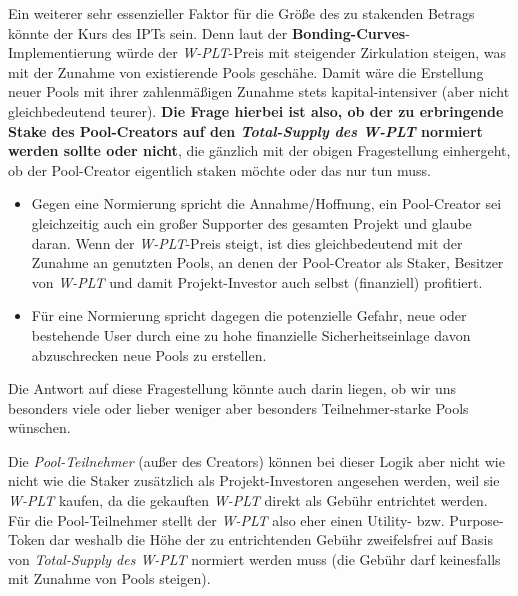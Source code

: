 \vspace{1.0cm}

\begin{Problem}
\vspace{0.2cm}


\vspace{0.5cm}


\vspace{0.5cm}

Ein weiterer sehr essenzieller Faktor für die Größe des zu stakenden Betrags könnte der Kurs des IPTs sein. Denn laut der \textbf{Bonding-Curves}-Implementierung würde der \textit{W-PLT}-Preis mit steigender Zirkulation steigen, was mit der Zunahme von existierende Pools geschähe. Damit wäre die Erstellung neuer Pools mit ihrer zahlen\-mäßigen Zunahme stets kapital-intensiver (aber nicht gleichbedeutend teurer). \textbf{Die Frage hierbei ist also, ob der zu erbringende Stake des Pool-Creators auf den \textit{Total-Supply des W-PLT} normiert werden sollte oder nicht}, die gänzlich mit der obigen Fragestellung einhergeht, ob der Pool-Creator eigentlich staken möchte oder das nur tun muss.
	
\begin{itemize}
	\item Gegen eine Normierung spricht die Annahme/Hoffnung, ein Pool-Creator sei gleichzeitig auch ein großer Supporter des gesamten Projekt und glaube daran. Wenn der \textit{W-PLT}-Preis steigt, ist dies gleichbedeutend mit der Zunahme an genutzten Pools, an denen der Pool-Creator als Staker, Besitzer von \textit{W-PLT} und damit Projekt-Investor auch selbst (finanziell) profitiert.
	\item Für eine Normierung spricht dagegen die potenzielle Gefahr, neue oder bestehende User durch eine zu hohe finanzielle Sicherheitseinlage davon abzuschrecken neue Pools zu erstellen.
\end{itemize}

\vspace{0.2cm}
	
Die Antwort auf diese Fragestellung könnte auch darin liegen, ob wir uns besonders viele oder lieber weniger aber besonders Teilnehmer-starke Pools wünschen.

\vspace{0.5cm}
	
Die \textit{Pool-Teilnehmer} (außer des Creators) können bei dieser Logik aber nicht wie nicht wie die Staker zusätzlich als Projekt-Investoren angesehen werden, weil sie \textit{W-PLT} kaufen, da die gekauften \textit{W-PLT} direkt als Gebühr entrichtet werden. Für die Pool-Teilnehmer stellt der \textit{W-PLT} also eher einen Utility- bzw. Purpose-Token dar weshalb die Höhe der zu entrichtenden Gebühr zweifelsfrei auf Basis von \textit{Total-Supply des W-PLT} normiert werden muss (die Gebühr darf keinesfalls mit Zunahme von Pools steigen).


\end{Problem}
